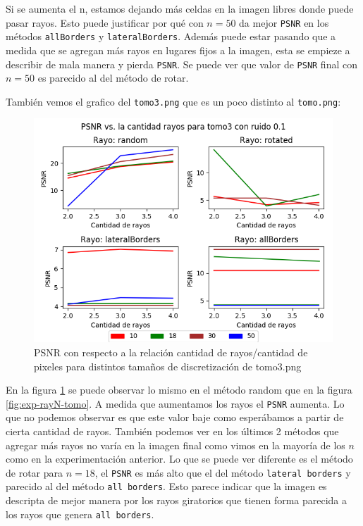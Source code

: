 Si se aumenta el n, estamos dejando más celdas en la imagen libres donde puede pasar rayos.
Esto puede justificar por qué con $n = 50$ da mejor \verb|PSNR| en los métodos \verb|allBorders| y \verb|lateralBorders|.
Además puede estar pasando que a medida que se agregan más rayos en lugares fijos a la imagen,
esta se empieze a describir de mala manera y pierda \verb|PSNR|.
Se puede ver que valor de \verb|PSNR| final con $n = 50$ es parecido al del método de rotar.

También vemos el grafico del \verb|tomo3.png| que es un poco distinto al \verb|tomo.png|:

\begin{figure}[H]
    \centering
    \includegraphics[width=\textwidth]{../graficos/ray_params/tomo3/noise_graph_0.png}
    \caption{PSNR con respecto a la relación cantidad de rayos/cantidad de pixeles para distintos tamaños de discretización de tomo3.png}
    \label{fig:exp-rayN-tomo3}
\end{figure}

En la figura \ref{fig:exp-rayN-tomo3} se puede observar lo mismo en el método random que en la figura     \ref{fig:exp-rayN-tomo}. A medida que aumentamos los rayos el \verb|PSNR| aumenta. Lo que no podemos observar es que este valor baje como esperábamos a partir de cierta cantidad de rayos. También podemos ver en los últimos 2 métodos que agregar más rayos no varía en la imagen final como vimos en la mayoría de los $n$ como en la experimentación anterior. Lo que se puede ver diferente es el método de rotar para $n = 18$, el \verb|PSNR| es más alto que el del método \verb|lateral borders| y parecido al del método \verb|all borders|. Esto parece indicar que la imagen es descripta de mejor manera por los rayos giratorios que tienen forma parecida a los rayos que genera  \verb|all borders|.

